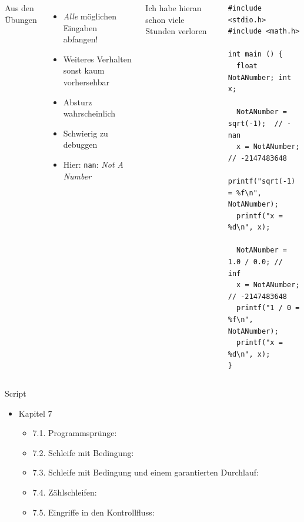 
\begin{frame}[fragile]
%
\begin{columns}[T]
\begin{Large}
{Aus den Übungen}
\vspace{6pt}
\end{Large}
%
\begin{itemize}
\item \emph{Alle} möglichen Eingaben abfangen!
\item Weiteres Verhalten sonst kaum vorhersehbar
\item Absturz wahrscheinlich
\item Schwierig zu debuggen
\item Hier: \texttt{nan}: \emph{Not A Number}
\end{itemize}
\begin{warnbox}
Ich habe hieran schon viele Stunden verloren
\end{warnbox}
%
\begin{codebox}
\begin{verbatim}
#include <stdio.h>
#include <math.h>

int main () {
  float NotANumber; int x;
	
  NotANumber = sqrt(-1);  // -nan
  x = NotANumber;         // -2147483648
  printf("sqrt(-1) = %f\n", NotANumber);
  printf("x = %d\n", x);

  NotANumber = 1.0 / 0.0; //  inf
  x = NotANumber;         // -2147483648
  printf("1 / 0 = %f\n", NotANumber);
  printf("x = %d\n", x);
}
\end{verbatim}
\end{codebox}
\end{columns}
%
\end{frame}


\begin{frame}{Script}
%
\begin{itemize}
\item Kapitel 7
	\begin{itemize}
	\item 7.1. Programmsprünge: 
	\item 7.2. Schleife mit Bedingung: 
	\item 7.3. Schleife mit Bedingung und einem garantierten Durchlauf: 
	\item 7.4. Zählschleifen: 
	\item 7.5. Eingriffe in den Kontrollfluss: 
	\end{itemize}
\end{itemize}
%
\end{frame}

